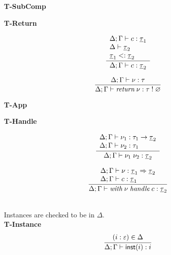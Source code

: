 \begin{minipage}{0.5\textwidth}
\textbf{T-SubComp}
\end{minipage}
\begin{minipage}{0.5\textwidth}
\textbf{T-Return}
\end{minipage}
\begin{minipage}{0.5\textwidth}
\[\frac{
	\begin{array}{l}
	\Delta;\Gamma \vdash c : \underline{\tau}_1 \\
	\Delta \vdash \underline{\tau}_2 \\
	\underline{\tau}_1 <: \underline{\tau}_2
	\end{array}
}{
	\Delta;\Gamma \vdash c : \underline{\tau}_2
}\]
\vspace{10pt}
\end{minipage}
\begin{minipage}{0.5\textwidth}
\[\frac{
	\Delta;\Gamma \vdash \nu : \tau
}{
	\Delta;\Gamma \vdash \textit{return} \; \nu : \tau \; ! \; \varnothing
}\]
\vspace{10pt}
\end{minipage}
\newpage
\begin{minipage}{0.5\textwidth}
\textbf{T-App}
\end{minipage}
\begin{minipage}{0.5\textwidth}
\textbf{T-Handle}
\end{minipage}
\begin{minipage}{0.5\textwidth}
\[\frac{
	\begin{array}{l}
	\Delta;\Gamma \vdash \nu_1 : \tau_1 \rightarrow \underline{\tau}_2 \\
	\Delta;\Gamma \vdash \nu_2 : \tau_1
	\end{array}
}{
	\Delta;\Gamma \vdash \nu_1 \; \nu_2 : \underline{\tau}_2
}\]
\vspace{10pt}
\end{minipage}
\begin{minipage}{0.5\textwidth}
\[\frac{
	\begin{array}{l}
	\Delta;\Gamma \vdash \nu : \underline{\tau}_1 \Rightarrow \underline{\tau}_2 \\
	\Delta;\Gamma \vdash c : \underline{\tau}_1 \\
	\end{array}
}{
	\Delta;\Gamma \vdash \textit{with} \; \nu \; \textit{handle} \; c : \underline{\tau}_2
}\]
\vspace{10pt}
\end{minipage}
\\


Instances are checked to be in $\Delta$.\\
\textbf{T-Instance}
\[\frac{
	\begin{array}{l}
	(i:\varepsilon)\in\Delta \\
	\end{array}
}{
	\Delta;\Gamma \vdash \mathsf{inst}(i) : i
}\]



